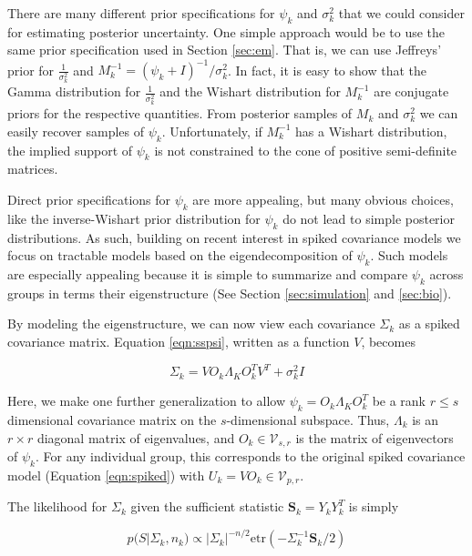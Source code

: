 \documentclass{article}
\newcommand{\etr}{\text{etr}}
\begin{document}
There are many different prior specifications for $\psi_k$ and
$\sigma_k^2$ that we could consider for estimating posterior
uncertainty.  One simple approach would be to use the same prior
specification used in Section \ref{sec:em}.  That is, we can use
Jeffreys' prior for $\frac{1}{\sigma_k^2}$ and
$M_k^{-1} = (\psi_k + I) ^{-1}/\sigma_k^2$.  In fact, it is easy to
show that the Gamma distribution for $\frac{1}{\sigma_k^2}$ and the
Wishart distribution for $M_k^{-1}$ are conjugate priors for the
respective quantities.  From posterior samples of $M_k$ and
$\sigma_k^2$ we can easily recover samples of $\psi_k$.
Unfortunately, if $M_k^{-1}$ has a Wishart distribution, the implied
support of $\psi_k$ is not constrained to the cone of positive
semi-definite matrices.  

Direct prior specifications for $\psi_k$ are more appealing, but many
obvious choices, like the inverse-Wishart prior distribution for
$\psi_k$ do not lead to simple posterior distributions.  As such,
building on recent interest in spiked covariance models
\citep{Hoff2009, Donoho2013, Paul2007} we focus on tractable models
based on the eigendecomposition of $\psi_k$.  Such models are
especially appealing because it is simple to summarize and compare
$\psi_k$ across groups in terms their eigenstructure (See Section
\ref{sec:simulation} and \ref{sec:bio}).

By modeling the eigenstructure, we can now view each covariance
$\Sigma_k$ as a spiked covariance matrix.  Equation \ref{eqn:sspsi}, written as a function $V$, becomes

\begin{equation}
\Sigma_k = VO_k\Lambda_KO_k^TV^T + \sigma^2_kI
\label{eqn:ss}
\end{equation}

Here, we make one further generalization to allow
$\psi_k = O_k\Lambda_KO_k^T$ be a rank $r \leq s$ dimensional covariance
matrix on the $s$-dimensional subspace.  Thus, $\Lambda_k$ is an $r \times
r$ diagonal matrix of eigenvalues, and $O_k \in
\mathcal{V}_{s,r}$ is the matrix of eigenvectors of
$\psi_k$.  For any individual group, this corresponds to the original spiked
covariance model (Equation \ref{eqn:spiked}) with $U_k = VO_k \in
\mathcal{V}_{p, r}$.

The likelihood for $\Sigma_k$ given the sufficient statistic $\mathbf{S}_k = Y_kY_k^T$ is simply

\begin{equation}
p(S | \Sigma_k,n_k) \propto |\Sigma_k|^{-n/2}\etr(-\Sigma_k^{-1}\mathbf{S}_k/2)
\end{equation}
\end{document}
